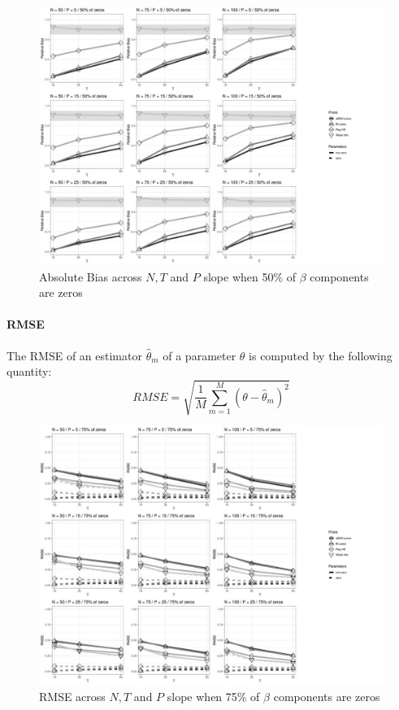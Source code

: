 \documentclass[a4paper,12pt]{article}
\begin{document}
\begin{figure}[]\label{fig:RBias_nz50}
\centering 
\includegraphics[width=18cm]{Rel_Bias_nz50_beta.jpg}
\caption{Absolute Bias across $N, T$ and $P$ slope when 50\% of $\beta$ components are zeros}
\end{figure}

\clearpage
\paragraph{RMSE}
The RMSE of an estimator $\hat{\theta}_m$ of a parameter $\theta$ is computed by the following  quantity:
\[  RMSE = \sqrt{\frac{1}{M}\sum_{m=1}^{M}(\theta-\hat{\theta}_m)^2} \]

\begin{figure}[h]\label{fig:MSE_nz25}
\centering 
\includegraphics[width=18cm]{MSE_nz25_beta.jpg}
\caption{RMSE across $N, T$ and $P$ slope when 75\% of $\beta$ components are zeros}
\end{figure}
\end{document}

